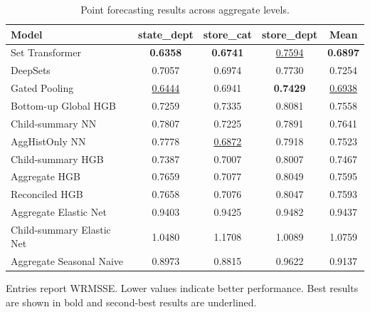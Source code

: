 \begin{table}[H]
\centering
\caption{Point forecasting results across aggregate levels.}
\label{tab:main_point}
\begin{threeparttable}
\begin{tabular}{lcccc}
\toprule
Model & state\_dept & store\_cat & store\_dept & Mean \\
\midrule
Set Transformer & \textbf{0.6358} & \textbf{0.6741} & \underline{0.7594} & \textbf{0.6897} \\
DeepSets & 0.7057 & 0.6974 & 0.7730 & 0.7254 \\
Gated Pooling & \underline{0.6444} & 0.6941 & \textbf{0.7429} & \underline{0.6938} \\
Bottom-up Global HGB & 0.7259 & 0.7335 & 0.8081 & 0.7558 \\
Child-summary NN & 0.7807 & 0.7225 & 0.7891 & 0.7641 \\
AggHistOnly NN & 0.7778 & \underline{0.6872} & 0.7918 & 0.7523 \\
Child-summary HGB & 0.7387 & 0.7007 & 0.8007 & 0.7467 \\
Aggregate HGB & 0.7659 & 0.7077 & 0.8049 & 0.7595 \\
Reconciled HGB & 0.7658 & 0.7076 & 0.8047 & 0.7593 \\
Aggregate Elastic Net & 0.9403 & 0.9425 & 0.9482 & 0.9437 \\
Child-summary Elastic Net & 1.0480 & 1.1708 & 1.0089 & 1.0759 \\
Aggregate Seasonal Naive & 0.8973 & 0.8815 & 0.9622 & 0.9137 \\
\bottomrule
\end{tabular}
\begin{tablenotes}
\footnotesize \item Entries report WRMSSE. Lower values indicate better performance. Best results are shown in bold and second-best results are underlined.
\end{tablenotes}
\end{threeparttable}
\end{table}
